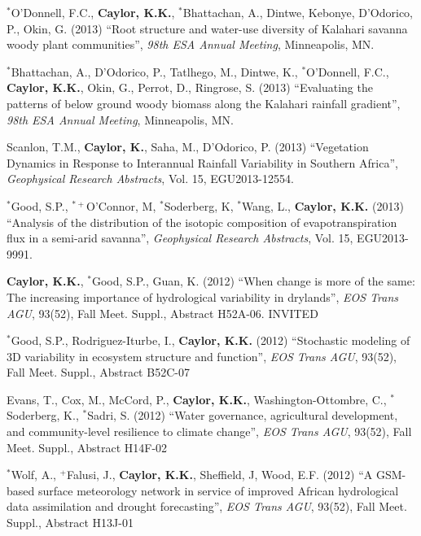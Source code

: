\documentclass[10pt]{report}
\begin{document}
\begin{etaremune}
\item $^{*}$O'Donnell, F.C., \textbf{Caylor, K.K.}, $^{*}$Bhattachan, A., Dintwe, Kebonye, D'Odorico, P., Okin, G. (2013) ``Root structure and water-use diversity of Kalahari savanna woody plant communities'', \emph{98th ESA Annual Meeting}, Minneapolis, MN.

\item $^{*}$Bhattachan, A., D'Odorico, P., Tatlhego, M., Dintwe, K., $^{*}$O'Donnell, F.C., \textbf{Caylor, K.K.}, Okin, G., Perrot, D., Ringrose, S. (2013) ``Evaluating the patterns of below ground woody biomass along the Kalahari rainfall gradient'', \emph{98th ESA Annual Meeting}, Minneapolis, MN.

\item Scanlon, T.M., \textbf{Caylor, K.}, Saha, M., D'Odorico, P. (2013) ``Vegetation Dynamics in Response to Interannual Rainfall Variability in Southern Africa'', \emph{Geophysical Research Abstracts}, Vol. 15, EGU2013-12554.

\item $^{*}$Good, S.P., $^{*+}$O'Connor, M, $^{*}$Soderberg, K, $^{*}$Wang, L., \textbf{Caylor, K.K.} (2013) ``Analysis of the distribution of the isotopic composition of evapotranspiration flux in a semi-arid savanna'', \emph{Geophysical Research Abstracts}, Vol. 15, EGU2013-9991.

\item \textbf{Caylor, K.K.}, $^{*}$Good, S.P., Guan, K. (2012) ``When change is more of the same: The increasing importance of hydrological variability in drylands'', \emph{EOS Trans AGU}, 93(52), Fall Meet. Suppl., Abstract H52A-06. INVITED

\item $^{*}$Good, S.P., Rodriguez-Iturbe, I., \textbf{Caylor, K.K.} (2012) ``Stochastic modeling of 3D variability in ecosystem structure and function'', \emph{EOS Trans AGU}, 93(52), Fall Meet. Suppl., Abstract B52C-07

\item Evans, T., Cox, M., McCord, P., \textbf{Caylor, K.K.}, Washington-Ottombre, C., $^{*}$Soderberg, K., $^{*}$Sadri, S. (2012) ``Water governance, agricultural development, and community-level resilience to climate change'', \emph{EOS Trans AGU}, 93(52), Fall Meet. Suppl., Abstract H14F-02

\item $^{*}$Wolf, A., $^{+}$Falusi, J., \textbf{Caylor, K.K.}, Sheffield, J, Wood, E.F. (2012) ``A GSM-based surface meteorology network in service of improved African hydrological data assimilation and drought forecasting'', \emph{EOS Trans AGU}, 93(52), Fall Meet. Suppl., Abstract H13J-01


\end{etaremune}
\end{document}
